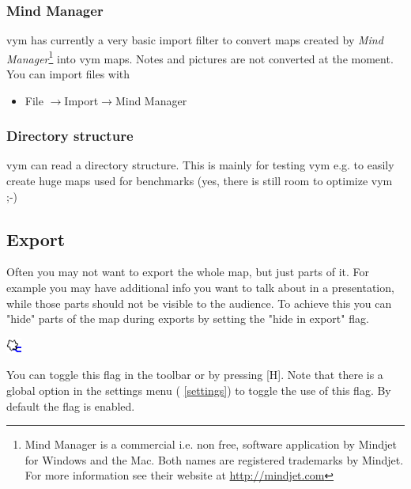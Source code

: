\documentclass[12pt,a4paper]{article}
\newcommand{\vym}{{\sc vym }}
\newcommand{\ra}{$\longrightarrow$}
\newcommand{\key}[1]{[#1]}
\begin{document}
\subsubsection*{Mind Manager}
\vym has currently a very basic import filter to convert maps created by
{\em Mind Manager}\footnote{Mind Manager is a commercial i.e. non free, software application by Mindjet for Windows and the Mac. Both names are registered trademarks by Mindjet. For more information see their website at
\href{http://mindjet.com}{http://mindjet.com}} into \vym maps. Notes and
pictures are not converted at the moment. You can import files with
\begin{itemize}
    \item File \ra Import\ra Mind Manager
\end{itemize}


\subsubsection*{Directory structure}
\vym can read a directory structure. This is mainly for
testing \vym e.g. to easily create huge maps used for benchmarks (yes,
there is still room to optimize \vym ;-)




\subsection{Export}  \label{export}
\label{hideexport}
Often you may not want to export the whole map, but just parts of it. For
example you may have additional info you want to talk about in a
presentation, while those parts should not be visible to the audience.
To achieve this you can "hide" parts of the map during exports by
setting the "hide in export" flag.
\begin{center}
    \includegraphics[width=0.5cm]{images/flag-hideexport.png}
\end{center}
You can toggle this flag in the toolbar or by pressing \key{H}.
Note that there is a global option in the settings menu (
\ref{settings}) to toggle the use of this flag. By default the flag is
enabled.
\end{document}
